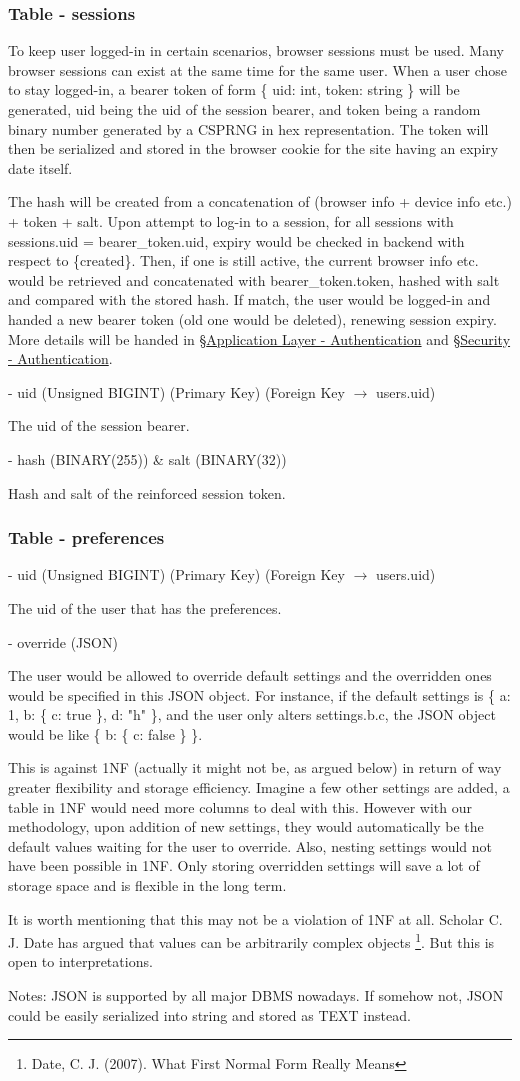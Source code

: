 \documentclass[12pt]{report}
\newcommand{\n}{\par}
\newcommand{\br}{\n\vspace{1 em}\n}
\begin{document}
\subsubsection{Table - sessions} \label{data-layer.design.user-system.sessions}
To keep user logged-in in certain scenarios, browser sessions must be used.
Many browser sessions can exist at the same time for the same user.
When a user chose to stay logged-in, a bearer token of form
\{ uid: int, token: string \}
will be generated,
uid being the uid of the session bearer, and
token being a random binary number generated by a CSPRNG in hex representation.
The token will then be serialized and stored in the browser cookie for the site having an expiry date itself.\n
The hash will be created from a concatenation of (browser info + device info etc.) + token + salt.
Upon attempt to log-in to a session,
for all sessions with sessions.uid = bearer\_token.uid,
expiry would be checked in backend with respect to \{created\}.
Then, if one is still active, the current browser info etc. would be retrieved and concatenated with bearer\_token.token,
hashed with salt and compared with the stored hash.
If match, the user would be logged-in and handed a new bearer token (old one would be deleted), renewing session expiry.
More details will be handed in \S \hyperref[application-layer.implementation.authentication]{Application Layer - Authentication} and
\S \hyperref[security.authentication]{Security - Authentication}.
\br
- uid (Unsigned BIGINT) (Primary Key) (Foreign Key $\rightarrow$ users.uid)\n
The uid of the session bearer.
\br
- hash (BINARY(255)) \& salt (BINARY(32))\n
Hash and salt of the reinforced session token.

\subsubsection{Table - preferences} \label{data-layer.design.user-system.preferences}
- uid (Unsigned BIGINT) (Primary Key) (Foreign Key $\rightarrow$ users.uid)\n
The uid of the user that has the preferences.
\br
- override (JSON)\n
The user would be allowed to override default settings and the overridden ones would be specified in this JSON object.
For instance, if the default settings is \{ a: 1, b: \{ c: true \}, d: "h" \},
and the user only alters settings.b.c, the JSON object would be like \{ b: \{ c: false \} \}.\n
This is against 1NF (actually it might not be, as argued below) in return of way greater flexibility and storage efficiency.
Imagine a few other settings are added, a table in 1NF would need more columns to deal with this.
However with our methodology, upon addition of new settings, they would automatically be the default values waiting for the user to override.
Also, nesting settings would not have been possible in 1NF.
Only storing overridden settings will save a lot of storage space and is flexible in the long term.\n
It is worth mentioning that this may not be a violation of 1NF at all.
Scholar C. J. Date has argued that values can be arbitrarily complex objects \footnote{Date, C. J. (2007). What First Normal Form Really Means}.
But this is open to interpretations.\n
Notes: JSON is supported by all major DBMS nowadays. If somehow not, JSON could be easily serialized into string and stored as TEXT instead.
\end{document}
